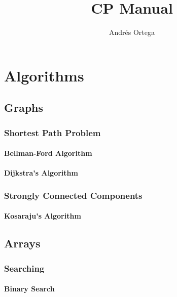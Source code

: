 \documentclass[12pt]{book}
\newcommand{\<}{\langle}
\renewcommand{\>}{\rangle}
\renewcommand{\(}{\left(}
\renewcommand{\)}{\right)}
\begin{document}
\title{CP Manual}
\author{Andrés Ortega}
\date{}

\maketitle

\tableofcontents

\chapter{Algorithms}
    \section{Graphs}
        \subsection{Shortest Path Problem}
            \subsubsection{Bellman-Ford Algorithm}
                
            \subsubsection{Dijkstra's Algorithm}
                
        \subsection{Strongly Connected Components}
            \subsubsection{Kosaraju's Algorithm}
                
    \section{Arrays}
        \subsection{Searching}
            \subsubsection{Binary Search}
                
\end{document}

